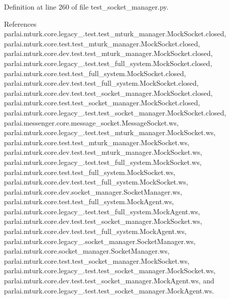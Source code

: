Definition at line 260 of file test\+\_\+socket\+\_\+manager.\+py.



References parlai.\+mturk.\+core.\+legacy\+\_.\+test.\+test\+\_\+mturk\+\_\+manager.\+Mock\+Socket.\+closed, parlai.\+mturk.\+core.\+test.\+test\+\_\+mturk\+\_\+manager.\+Mock\+Socket.\+closed, parlai.\+mturk.\+core.\+dev.\+test.\+test\+\_\+mturk\+\_\+manager.\+Mock\+Socket.\+closed, parlai.\+mturk.\+core.\+legacy\+\_.\+test.\+test\+\_\+full\+\_\+system.\+Mock\+Socket.\+closed, parlai.\+mturk.\+core.\+test.\+test\+\_\+full\+\_\+system.\+Mock\+Socket.\+closed, parlai.\+mturk.\+core.\+dev.\+test.\+test\+\_\+full\+\_\+system.\+Mock\+Socket.\+closed, parlai.\+mturk.\+core.\+dev.\+test.\+test\+\_\+socket\+\_\+manager.\+Mock\+Socket.\+closed, parlai.\+mturk.\+core.\+test.\+test\+\_\+socket\+\_\+manager.\+Mock\+Socket.\+closed, parlai.\+mturk.\+core.\+legacy\+\_.\+test.\+test\+\_\+socket\+\_\+manager.\+Mock\+Socket.\+closed, parlai.\+messenger.\+core.\+message\+\_\+socket.\+Message\+Socket.\+ws, parlai.\+mturk.\+core.\+legacy\+\_.\+test.\+test\+\_\+mturk\+\_\+manager.\+Mock\+Socket.\+ws, parlai.\+mturk.\+core.\+test.\+test\+\_\+mturk\+\_\+manager.\+Mock\+Socket.\+ws, parlai.\+mturk.\+core.\+dev.\+test.\+test\+\_\+mturk\+\_\+manager.\+Mock\+Socket.\+ws, parlai.\+mturk.\+core.\+legacy\+\_.\+test.\+test\+\_\+full\+\_\+system.\+Mock\+Socket.\+ws, parlai.\+mturk.\+core.\+test.\+test\+\_\+full\+\_\+system.\+Mock\+Socket.\+ws, parlai.\+mturk.\+core.\+dev.\+test.\+test\+\_\+full\+\_\+system.\+Mock\+Socket.\+ws, parlai.\+mturk.\+core.\+dev.\+socket\+\_\+manager.\+Socket\+Manager.\+ws, parlai.\+mturk.\+core.\+test.\+test\+\_\+full\+\_\+system.\+Mock\+Agent.\+ws, parlai.\+mturk.\+core.\+legacy\+\_.\+test.\+test\+\_\+full\+\_\+system.\+Mock\+Agent.\+ws, parlai.\+mturk.\+core.\+dev.\+test.\+test\+\_\+socket\+\_\+manager.\+Mock\+Socket.\+ws, parlai.\+mturk.\+core.\+dev.\+test.\+test\+\_\+full\+\_\+system.\+Mock\+Agent.\+ws, parlai.\+mturk.\+core.\+legacy\+\_.\+socket\+\_\+manager.\+Socket\+Manager.\+ws, parlai.\+mturk.\+core.\+socket\+\_\+manager.\+Socket\+Manager.\+ws, parlai.\+mturk.\+core.\+test.\+test\+\_\+socket\+\_\+manager.\+Mock\+Socket.\+ws, parlai.\+mturk.\+core.\+legacy\+\_.\+test.\+test\+\_\+socket\+\_\+manager.\+Mock\+Socket.\+ws, parlai.\+mturk.\+core.\+dev.\+test.\+test\+\_\+socket\+\_\+manager.\+Mock\+Agent.\+ws, and parlai.\+mturk.\+core.\+legacy\+\_.\+test.\+test\+\_\+socket\+\_\+manager.\+Mock\+Agent.\+ws.

\mbox{\label{classparlai_1_1mturk_1_1core_1_1test_1_1test__socket__manager_1_1MockSocket_ac6e66202fba2b24eddd6652e5737efbe}} 
